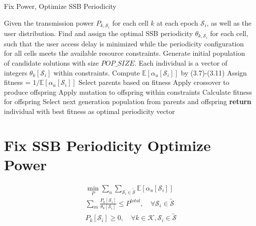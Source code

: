 \begin{algorithm}[H]
    \caption{Fix Power, Optimize SSB Periodicity}
    \label{alg:FPOS}
    \begin{algorithmic}[1]
        \REQUIRE{}
        Given the transmission power $P_{k, \mathcal{S}_i}$ for each cell $k$ at each epoch $\mathcal{S}_i$, as well as the user distribution.
        \ENSURE
        Find and assign the optimal SSB periodicity $\theta_{k,\mathcal{S}_i}$ for each cell, such that the user access delay is minimized while the periodicity configuration for all cells meets the available resource constraints.
        \STATE Generate initial population of candidate solutions with size $POP\_SIZE$.
        \STATE Each individual is a vector of integers $\theta_k[\mathcal{S}_i]$ within constraints. 
                \STATE Compute $\mathbb{E}[\alpha_u[\mathcal{S}_i]]$ by (3.7)-(3.11)
                \STATE Assign fitness = $1 / \mathbb{E}[\alpha_u[\mathcal{S}_i]]$
            \ENDFOR
            \STATE Select parents based on fitness
            \STATE Apply crossover to produce offspring
            \STATE Apply mutation to offspring within constraints
            \STATE Calculate fitness for offspring
            \STATE Select next generation population from parents and offspring
        \ENDFOR
        \STATE \textbf{return} individual with best fitness as optimal periodicity vector
    \end{algorithmic}
\end{algorithm}

\section{Fix SSB Periodicity Optimize Power}

\begin{subequations} \label{eq:main}
\begin{align}
    &\min_{P} \sum_{u} \sum_{\mathcal{S}_i\in \mathcal{\widetilde{S}}} \mathbb{E}[\alpha_u[\mathcal{S}_i]] \\
    &\sum_{m} \frac{P_{k}[\mathcal{S}_i]}{\theta_k[\mathcal{S}_i]} \leq P^{total}, \quad \forall \mathcal{S}_i \in \mathcal{\widetilde{S}}  \\ 
    &P_k[\mathcal{S}_i]\geq 0, \quad \forall k\in\mathcal{K}, \mathcal{S}_i\in\mathcal{\widetilde{S}}
\end{align}
\end{subequations}

